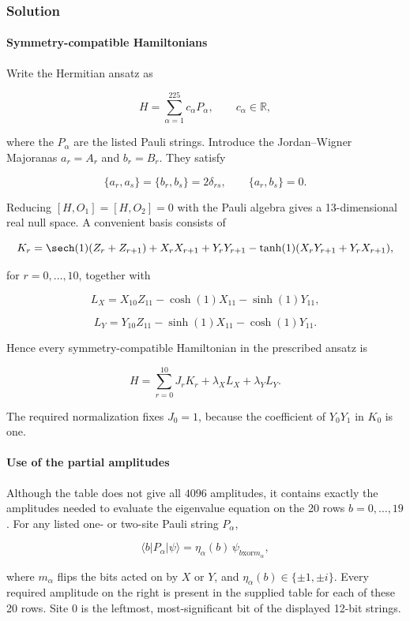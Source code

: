 \subsubsection*{Solution}
\paragraph*{Symmetry-compatible Hamiltonians}

Write the Hermitian ansatz as

\[
H=\sum_{\alpha=1}^{225}c_\alpha P_\alpha,
\qquad c_\alpha\in\mathbb R,
\]

where the $P_\alpha$ are the listed Pauli strings. Introduce the
Jordan--Wigner Majoranas $a_r=A_r$ and $b_r=B_r$. They satisfy

\[
\{a_r,a_s\}=\{b_r,b_s\}=2\delta_{rs},
\qquad \{a_r,b_s\}=0.
\]

Reducing $[H,O_1]=[H,O_2]=0$ with the Pauli algebra gives a
13-dimensional real null space. A convenient basis consists of

\[
K_r=\sech(1)(Z_r+Z_{r+1})+X_rX_{r+1}+Y_rY_{r+1}
-\tanh(1)(X_rY_{r+1}+Y_rX_{r+1}),
\]

for $r=0,\ldots,10$, together with

\[
L_X=X_{10}Z_{11}-\cosh(1)X_{11}-\sinh(1)Y_{11},
\]

\[
L_Y=Y_{10}Z_{11}-\sinh(1)X_{11}-\cosh(1)Y_{11}.
\]

Hence every symmetry-compatible Hamiltonian in the prescribed ansatz is

\[
H=\sum_{r=0}^{10}J_rK_r+\lambda_XL_X+\lambda_YL_Y.
\]

The required normalization fixes $J_0=1$, because the coefficient of
$Y_0Y_1$ in $K_0$ is one.

\paragraph*{Use of the partial amplitudes}

Although the table does not give all $4096$ amplitudes, it contains exactly
the amplitudes needed to evaluate the eigenvalue equation on the 20 rows
$b=0,\ldots,19$. For any listed one- or two-site Pauli string $P_\alpha$,

\[
\langle b|P_\alpha|\psi\rangle
=\eta_\alpha(b)\,\psi_{b\mathbin{\mathrm{xor}}m_\alpha},
\]

where $m_\alpha$ flips the bits acted on by $X$ or $Y$, and
$\eta_\alpha(b)\in\{\pm1,\pm i\}$. Every required amplitude on the right is
present in the supplied table for each of these 20 rows. Site 0 is the
leftmost, most-significant bit of the displayed 12-bit strings.

